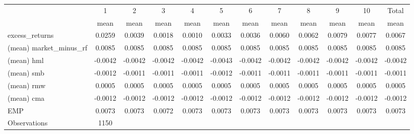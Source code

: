 \begin{tabular}{l*{11}{c}}
\hline\hline
                    &           1&           2&           3&           4&           5&           6&           7&           8&           9&          10&       Total\\
                    &        mean&        mean&        mean&        mean&        mean&        mean&        mean&        mean&        mean&        mean&        mean\\
\hline
excess\_returns      &      0.0259&      0.0039&      0.0018&      0.0010&      0.0033&      0.0036&      0.0060&      0.0062&      0.0079&      0.0077&      0.0067\\
(mean) market\_minus\_rf&      0.0085&      0.0085&      0.0085&      0.0085&      0.0085&      0.0085&      0.0085&      0.0085&      0.0085&      0.0085&      0.0085\\
(mean) hml          &     -0.0042&     -0.0042&     -0.0042&     -0.0042&     -0.0043&     -0.0042&     -0.0042&     -0.0042&     -0.0042&     -0.0042&     -0.0042\\
(mean) smb          &     -0.0012&     -0.0011&     -0.0011&     -0.0011&     -0.0012&     -0.0011&     -0.0011&     -0.0011&     -0.0011&     -0.0011&     -0.0011\\
(mean) rmw          &      0.0005&      0.0005&      0.0005&      0.0005&      0.0005&      0.0005&      0.0005&      0.0005&      0.0005&      0.0005&      0.0005\\
(mean) cma          &     -0.0012&     -0.0012&     -0.0012&     -0.0012&     -0.0012&     -0.0012&     -0.0012&     -0.0012&     -0.0012&     -0.0012&     -0.0012\\
EMP                 &      0.0073&      0.0073&      0.0072&      0.0073&      0.0073&      0.0073&      0.0073&      0.0073&      0.0073&      0.0073&      0.0073\\
\hline
Observations        &        1150&            &            &            &            &            &            &            &            &            &            \\
\hline\hline
\end{tabular}
